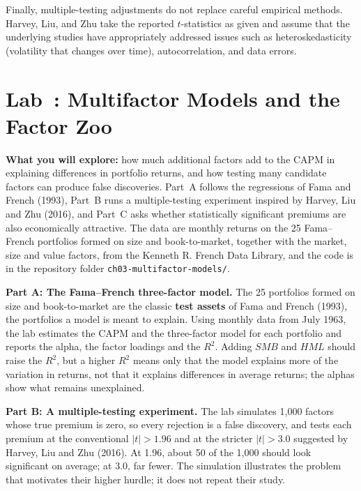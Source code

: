 Finally, multiple-testing adjustments do not replace
careful empirical methods. Harvey, Liu, and Zhu take the
reported $t$-statistics as given and assume that the
underlying studies have appropriately addressed issues
such as heteroskedasticity (volatility that changes over time), autocorrelation, and data
errors.


\section{Lab~\thechapter: Multifactor Models and the Factor Zoo}
\label{sec:04-lab}

\textbf{What you will explore:} how much additional factors add to the CAPM in explaining differences in portfolio returns, and how testing many candidate factors can produce false discoveries. Part~A follows the regressions of Fama and French (1993), Part~B runs a multiple-testing experiment inspired by Harvey, Liu and Zhu (2016), and Part~C asks whether statistically significant premiums are also economically attractive. The data are monthly returns on the 25 Fama--French portfolios formed on size and book-to-market, together with the market, size and value factors, from the Kenneth R. French Data Library, and the code is in the repository folder \texttt{ch03-multifactor-models/}.

\textbf{Part A: The Fama--French three-factor model.} The 25 portfolios formed on size and book-to-market are the classic \textbf{test assets} of Fama and French (1993), the portfolios a model is meant to explain. Using monthly data from July 1963, the lab estimates the CAPM and the three-factor model for each portfolio and reports the alpha, the factor loadings and the $R^2$. Adding $SMB$ and $HML$ should raise the $R^2$, but a higher $R^2$ means only that the model explains more of the variation in returns, not that it explains differences in average returns; the alphas show what remains unexplained.

\textbf{Part B: A multiple-testing experiment.} The lab simulates 1,000 factors whose true premium is zero, so every rejection is a false discovery, and tests each premium at the conventional $|t|>1.96$ and at the stricter $|t|>3.0$ suggested by Harvey, Liu and Zhu (2016). At 1.96, about 50 of the 1,000 should look significant on average; at 3.0, far fewer. The simulation illustrates the problem that motivates their higher hurdle; it does not repeat their study.

